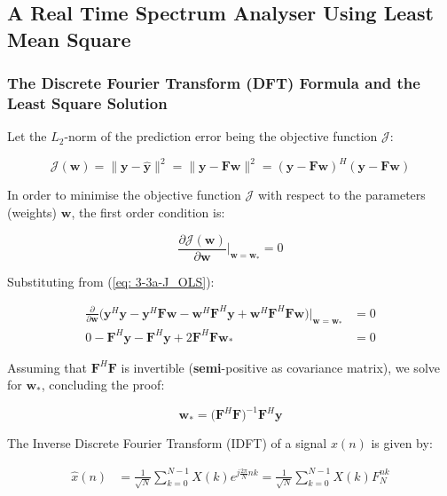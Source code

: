 \documentclass[12pt]{article}
\def\vy{{\bm{y}}}
\def\vw{{\bm{w}}}
\begin{document}
	\subsection{A Real Time Spectrum Analyser Using Least Mean Square} \label{sec: 3-3-real-time-spectrum-LMS}
		\subsubsection{The Discrete Fourier Transform (DFT) Formula and the Least Square Solution}
			Let the $L_{2}$-norm of the prediction error being the objective function $\mathcal{J}$:
			
			\begin{equation}
			\mathcal{J}(\vw) = \| \vy - \hat{\vy} \|^{2} = \| \vy - \mathbf{F} \vw \|^{2} = (\vy - \mathbf{F} \vw)^{H} (\vy - \mathbf{F} \vw)
			\label{eq: 3-3a-J_OLS}
			\end{equation}
			
			In order to minimise the objective function $\mathcal{J}$ with respect to the parameters (weights) $\vw$, the first order condition is:
			
			\begin{equation}
			\frac{\partial \mathcal{J}(\vw)}{\partial \vw} \bigg\vert_{\vw=\vw_{*}}  = 0
			\end{equation}
			
			Substituting from (\ref{eq: 3-3a-J_OLS}):
			
			\begin{align}
			\frac{\partial}{\partial \vw} \bigg( \vy^{H} \vy - \vy^{H} \mathbf{F} \vw - \vw^{H} \mathbf{F}^{H} \vy + \vw^{H} \mathbf{F}^{H} \mathbf{F} \vw \bigg) \bigg\vert_{\vw=\vw_{*}}  &= 0 \\
			0 - \mathbf{F}^{H} \vy - \mathbf{F}^{H} \vy + 2 \mathbf{F}^{H} \mathbf{F} \vw_{*} &= 0
			\end{align}
			
			Assuming that $\mathbf{F}^{H} \mathbf{F}$ is invertible (\textbf{semi}-positive as covariance matrix), we solve for $\vw_{*}$, concluding the proof:
			
			\begin{equation}
			\vw_{*} = \bigg( \mathbf{F}^{H} \mathbf{F} \bigg)^{-1} \mathbf{F}^{H} \vy
			\label{eq: 3-3a-OLS:proof}
			\end{equation}
			
			The Inverse Discrete Fourier Transform (IDFT) of a signal $x(n)$ is given by:
			
			\begin{align}
			\hat{x}(n)  &= \frac{1}{\sqrt{N}} \sum_{k=0}^{N-1} X(k) e^{j \frac{2\pi}{N} n k}
			= \frac{1}{\sqrt{N}} \sum_{k=0}^{N-1} X(k) F_{N}^{nk}
			\end{align}
			
\end{document}
